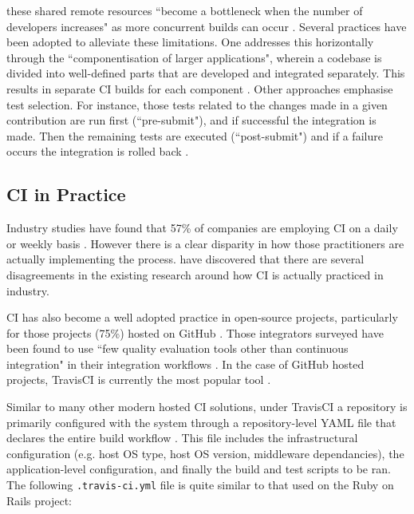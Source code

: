 \documentclass[journal]{IEEEtran}
\begin{document}
these shared remote resources ``become a bottleneck when the number
of developers increases" as more concurrent builds can occur \citep{Gambi}. Several practices have
been adopted to alleviate these limitations. One addresses this horizontally through the ``componentisation of larger
applications", wherein a codebase is divided into well-defined parts that are developed 
and integrated separately. This results in separate CI builds for each component \citep{Jez}.
Other approaches emphasise test selection. For instance, those tests related to the changes made in a given contribution
are run first (``pre-submit"), and if successful the integration is made. Then the remaining tests are executed (``post-submit") and if a failure occurs the integration is rolled back \citep{Elbaum}.


\subsection{CI in Practice}
Industry studies have found that 57\% of companies are employing
CI on a daily or weekly basis \citep{Forrester}. However there is a clear disparity in how those
practitioners are actually implementing the process. \citet{Stahl} have 
discovered that there are several disagreements in the existing research around how CI is actually practiced in industry. 
\par
CI has also become a well adopted practice in open-source projects,
particularly for those projects (75\%) hosted on GitHub \citep{Gous}. Those integrators surveyed 
have been found to use ``few quality evaluation tools other than
continuous integration" in their integration workflows \citep{Gous}. 
In the case of GitHub hosted projects, 
TravisCI is currently the most popular tool \citep{Yu}. 
\par
Similar to many other
modern hosted CI solutions, under TravisCI a repository is primarily configured 
with the system through a repository-level YAML file that declares the entire build workflow  \citep{Santos}.
This file includes the infrastructural configuration (e.g. host OS type, host OS version, middleware dependancies), 
the application-level configuration, and finally the build and test scripts to be ran. The following \texttt{.travis-ci.yml} file is quite
similar to that used on the Ruby on Rails project:
\end{document}
